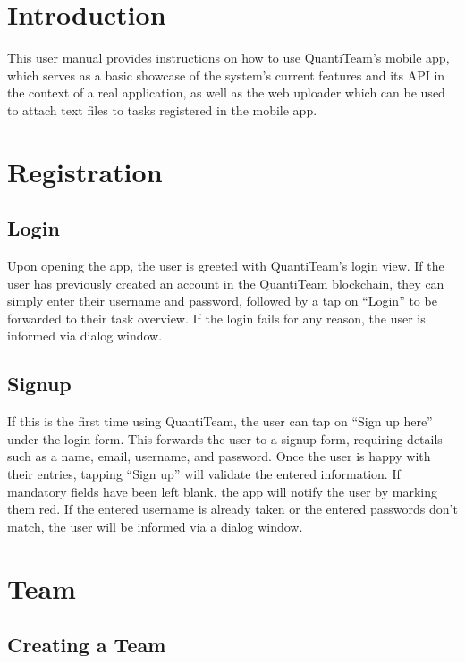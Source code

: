 \section{Introduction}\label{introduction}

This user manual provides instructions on how to use QuantiTeam's mobile
app, which serves as a basic showcase of the system's current features
and its API in the context of a real application, as well as the web
uploader which can be used to attach text files to tasks registered in
the mobile app.

\section{Registration}\label{registration}

\subsection{Login}\label{login}

Upon opening the app, the user is greeted with QuantiTeam's login view.
If the user has previously created an account in the QuantiTeam
blockchain, they can simply enter their username and password, followed
by a tap on ``Login'' to be forwarded to their task overview. If the
login fails for any reason, the user is informed via dialog window.


\subsection{Signup}\label{signup}

If this is the first time using QuantiTeam, the user can tap on ``Sign
up here'' under the login form. This forwards the user to a signup form,
requiring details such as a name, email, username, and password. Once
the user is happy with their entries, tapping ``Sign up'' will validate
the entered information. If mandatory fields have been left blank, the
app will notify the user by marking them red. If the entered username is
already taken or the entered passwords don't match, the user will be
informed via a dialog window.

\section{Team}\label{team}

\subsection{Creating a Team}\label{creating-a-team}

